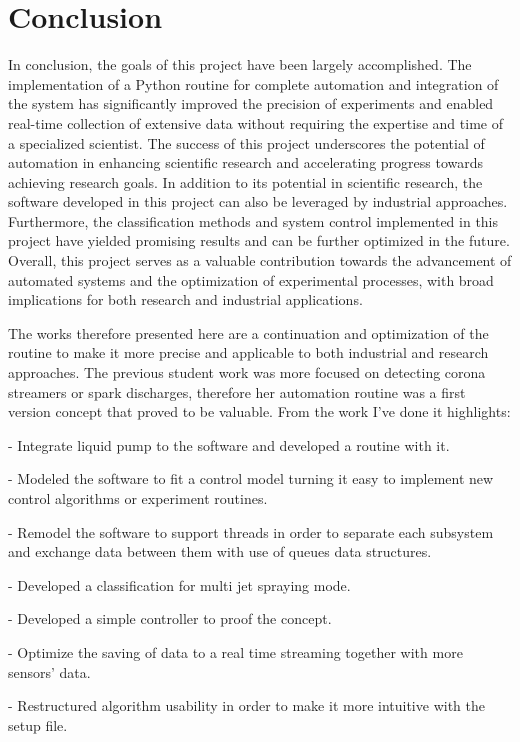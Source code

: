 \chapter{Conclusion}

In conclusion, the goals of this project have been largely accomplished. The implementation of a Python routine for complete automation and integration of the system has significantly improved the precision of experiments and enabled real-time collection of extensive data without requiring the expertise and time of a specialized scientist. The success of this project underscores the potential of automation in enhancing scientific research and accelerating progress towards achieving research goals.
In addition to its potential in scientific research, the software developed in this project can also be leveraged by industrial approaches. Furthermore, the classification methods and system control implemented in this project have yielded promising results and can be further optimized in the future. Overall, this project serves as a valuable contribution towards the advancement of automated systems and the optimization of experimental processes, with broad implications for both research and industrial applications.

The works therefore presented here are a continuation and optimization of the routine to make it more precise and applicable to both industrial and research approaches.
The previous student work was more focused on detecting corona streamers or spark discharges, therefore her automation routine was a first version concept that proved to be valuable.
From the work I've done it highlights:

- Integrate liquid pump to the software and developed a routine with it.

- Modeled the software to fit a control model turning it easy to implement new control algorithms or experiment routines.

- Remodel the software to support threads in order to separate each subsystem and exchange data between them with use of queues data structures.

- Developed a classification for multi jet spraying mode.

- Developed a simple controller to proof the concept.

- Optimize the saving of data to a real time streaming together with more sensors' data.

- Restructured algorithm usability in order to make it more intuitive with the setup file.


